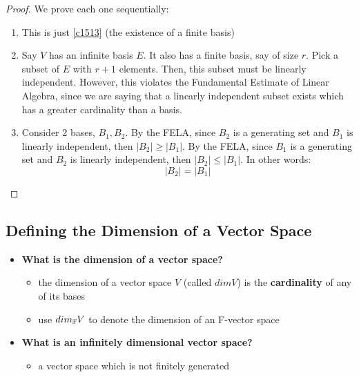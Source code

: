 \documentclass{exam}
\begin{document}

\begin{proof}

We prove each one sequentially:

\begin{enumerate}
    \item This is just \eqref{c1513} (the existence of a finite basis)
    \item Say $V$ has an infinite basis $E$. It also has a finite basis, say of size $r$. Pick a subset of $E$ with $r+1$ elements. Then, this subset must be linearly independent. However, this violates the Fundamental Estimate of Linear Algebra, since we are saying that a linearly independent subset exists which has a greater cardinality than a basis.
    \item Consider 2 bases, $B_1, B_2$. By the FELA, since $B_2$ is a generating set and $B_1$ is linearly independent, then $|B_2| \geq |B_1|$. By the FELA, since $B_1$ is a generating set and $B_2$ is linearly independent, then $|B_2| \leq |B_1|$. In other words:
    \[
    |B_2| = |B_1|
    \]
\end{enumerate}
\end{proof}

\subsection{Defining the Dimension of a Vector Space}

\begin{itemize}
    \item \textbf{What is the dimension of a vector space?}
    \begin{itemize}
        \item the dimension of a vector space $V$ (called $dim V$) is the \textbf{cardinality} of any of its bases
        \item use $dim_{\mathbb{F}} V$ to denote the dimension of an F-vector space
    \end{itemize}
    \item \textbf{What is an infinitely dimensional vector space?}
    \begin{itemize}
        \item a vector space which is not finitely generated
    \end{itemize}
\end{itemize}
\end{document}
